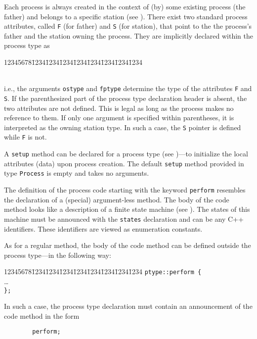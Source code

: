 Each process is always created in the context of (by) some existing process
(the father) and belongs to a specific station (see ).
There exist two standard process attributes, called
{\tt F} (for father) and {\tt S} (for station), that point to the
the process's father and the station owning the process.
They are implicitly declared within the process type as
{\tt\begin{tabbing}
12345678\=1234\=1234\=1234\=1234\=1234\=1234\=1234\=1234\kill
{}\>\\
\>\\
\end{tabbing}}
\noindent
i.e., the arguments {\tt ostype} and {\tt fptype}
determine the type of the attributes {\tt F} and {\tt S}.
If the parenthesized part of the process type
declaration header is absent, the two attributes are not defined.
This is legal as long as the process makes no reference to them.
If only one argument is specified within parentheses, it is interpreted as
the owning station type.
In such a case, the {\tt S} pointer is defined while {\tt F} is not.

A {\tt setup} method can be declared for a process type
(see )---to initialize the local attributes (data) upon
process creation.
The default {\tt setup} method provided in type {\tt Process} is empty
and takes no arguments.

The definition of the process code starting with the keyword
{\tt perform} resembles the declaration of a (special) argument-less method.
The body of the code method looks like a description of
a finite state machine (see ).
The states of this machine must be announced with the {\tt states} declaration
and can be any C++ identifiers.
These identifiers are viewed as enumeration constants.

As for a regular method,
the body of the code method can be defined outside the process type---in
the following way:
{\tt\begin{tabbing}
12345678\=1234\=1234\=1234\=1234\=1234\=1234\=1234\=1234\kill
\> {\tt ptype::perform \{} \\
\> \> \ldots \\
\> {\tt \};}
\end{tabbing}}
In such a case, the process type declaration must contain an announcement of
the code method in the form
\begin{verbatim}
        perform;
\end{verbatim}

